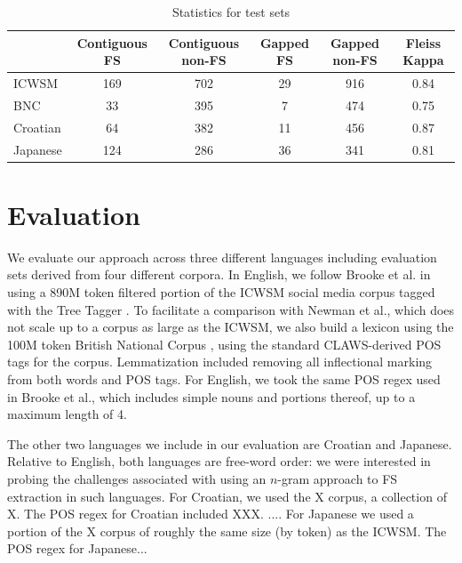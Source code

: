 \documentclass[11pt]{article}
\makeatletter
\def \al {al.\@ }
\makeatother
\begin{document}
\begin{table}[!bt]
 
 \begin{center}
  \caption{ Statistics for test sets}
	 \label{tab:stats}
	 \begin{tabular}{lccccc}

       \hline
			& Contiguous FS & Contiguous non-FS & Gapped FS & Gapped non-FS & Fleiss Kappa\\
			 \hline
			ICWSM & 169 & 702 & 29 & 916& 0.84 \\
			BNC & 33 & 395 & 7 & 474 & 0.75 \\
			Croatian & 64 & 382 & 11 & 456 & 0.87 \\
			Japanese & 124 & 286 & 36 & 341 & 0.81\\
       \hline
 \end{tabular}

 \end{center}

 \end{table}	

\section{Evaluation} \label{sec:evaluation}

We evaluate our approach across three different languages including evaluation sets derived from four different corpora. In English, we follow Brooke et \al {} in using a 890M token filtered portion of the ICWSM social media corpus \cite{ICWSM} tagged with the Tree Tagger \cite{Schmid95}. To facilitate a comparison with Newman et \al {}, which does not scale up to a corpus as large as the ICWSM, we also build a lexicon using the 100M token British National Corpus \cite{BNC}, using the standard CLAWS-derived POS tags for the corpus. Lemmatization included removing all inflectional marking from both words and POS tags. For English, we took the same POS regex used in Brooke et \al {}, which includes simple nouns and portions thereof, up to a maximum length of 4.

The other two languages we include in our evaluation are Croatian and Japanese. Relative to English, both languages are free-word order: we were interested in probing the challenges associated with using an $n$-gram approach to FS extraction in such languages. For Croatian, we used the X corpus, a collection of X. The POS regex for Croatian included XXX. .... For Japanese we used a portion of the X corpus of roughly the same size (by token) as the ICWSM. The POS regex for Japanese...
\end{document}
